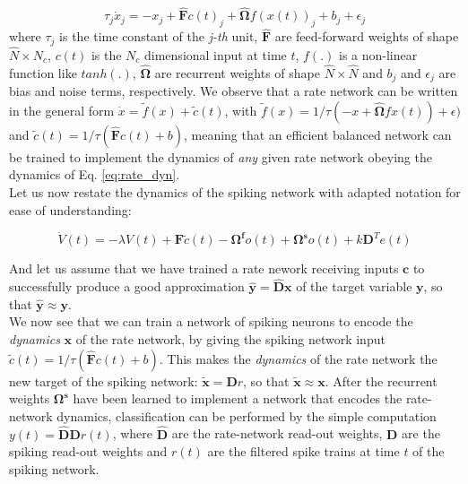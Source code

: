 \documentclass[twoside,11pt,titlepage]{article}
\begin{document}
\begin{equation} \label{eq:rate_dyn}
  \tau_j \dot{x}_j = -x_j + \hat{\mathbf{F}}c(t)_j + \hat{\mathbf{\Omega}}f(x(t))_j + b_j + \epsilon_j
\end{equation}
where $\tau_j$ is the time constant of the \textit{j-th} unit, $\hat{\mathbf{F}}$ are feed-forward weights of shape $\hat{N} \times N_c$, $c(t)$ is the $N_c$ dimensional input at time $t$,
$f(.)$ is a non-linear function like $tanh(.)$, $\hat{\mathbf{\Omega}}$ are recurrent weights of shape $\hat{N} \times \hat{N}$ and $b_j$ and $\epsilon_j$ are bias and noise terms, respectively.
We observe that a rate network can be written in the general form $\dot{x} = \tilde{f}(x) + \tilde{c}(t)$, with $\tilde{f}(x) = 1/\tau(-x + \hat{\mathbf{\Omega}}fx(t))+ \epsilon)$
and $\tilde{c}(t)=1/\tau(\hat{\mathbf{F}}c(t) + b)$, meaning that an efficient balanced network can be trained to implement the dynamics of \textit{any} given rate network obeying the
dynamics of Eq. \ref{eq:rate_dyn}. \\
Let us now restate the dynamics of the spiking network with adapted notation for ease of understanding:

\begin{equation*}
  \dot{V}(t) = -\lambda V(t) + \mathbf{F}\tilde{c}(t) - \mathbf{\Omega^f}o(t) + \mathbf{\Omega^s}o(t) + k\mathbf{D}^Te(t)
\end{equation*}

And let us assume that we have trained a rate nework receiving inputs $\mathbf{c}$ to successfully produce a good approximation $\hat{\mathbf{y}} = \hat{\mathbf{D}}\mathbf{x}$ of the target
variable $\mathbf{y}$, so that $\hat{\mathbf{y}} \approx \mathbf{y}$. \\
We now see that we can train a network of spiking neurons to encode the \textit{dynamics} $\mathbf{x}$ of the rate network, by giving the spiking network
input $\tilde{c}(t)=1/\tau(\hat{\mathbf{F}}c(t) + b)$. This makes the \textit{dynamics} of the rate network the new target of the spiking network: $\tilde{\mathbf{x}}=\mathbf{D}r$,
so that $\tilde{\mathbf{x}} \approx \mathbf{x}$. After the recurrent weights $\mathbf{\Omega^s}$ have been learned to implement a network that encodes the rate-network dynamics, classification
can be performed by the simple computation $y(t) = \hat{\mathbf{D}}\mathbf{D}r(t)$, where $\hat{\mathbf{D}}$ are the rate-network read-out weights, $\mathbf{D}$ are the spiking read-out weights
and $r(t)$ are the filtered spike trains at time $t$ of the spiking network. \\
\end{document}
